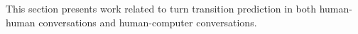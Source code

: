 This section presents work related to turn transition prediction in both human-human conversations and human-computer conversations.
